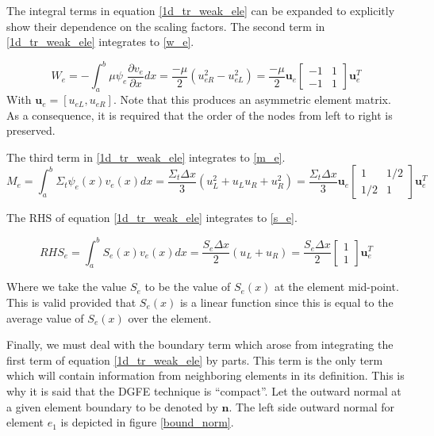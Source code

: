 The integral terms in equation \ref{1d_tr_weak_ele} can be expanded to explicitly show their dependence on the scaling factors.  The second term in \ref{1d_tr_weak_ele} integrates to \ref{w_e}.

\begin{equation}
W_e = -\int_a^b \mu \psi_e \frac{\partial v_e}{\partial x} dx = \frac{-\mu}{2}(u_{eR}^2 - u_{eL}^2) = 
\frac{-\mu}{2} \mathbf u_e 
\begin{bmatrix}
    -1      & 1 \\
    -1       & 1 
\end{bmatrix}
\mathbf u_e^T
\label{w_e}
\end{equation}
With $\mathbf u_e = [u_{eL}, u_{eR}]$.  Note that this produces an asymmetric element matrix.  As a consequence, it is required that the order of the nodes from left to right is preserved.

The third term in \ref{1d_tr_weak_ele} integrates to \ref{m_e}.
\begin{equation}
M_e = \int_a^b \Sigma_t \psi_e(x)v_e(x) dx =
\frac{\Sigma_t \Delta x}{3} (u_L^2 + u_L u_R + u_R^2) = 
\frac{\Sigma_t \Delta x}{3} \mathbf u_e 
\begin{bmatrix}
    1      & 1/2 \\
    1/2      & 1 
\end{bmatrix}
\mathbf u_e^T
\label{m_e}
\end{equation}

The RHS of equation \ref{1d_tr_weak_ele} integrates to \ref{s_e}.

\begin{equation}
RHS_e = \int_a^b S_e(x)v_e(x) dx =
\frac{S_e \Delta x}{2} (u_L + u_R) = 
\frac{S_e \Delta x}{2}
\begin{bmatrix}
    1     \\
    1 
\end{bmatrix}
\mathbf u_e^T
\label{s_e}
\end{equation}

Where we take the value $S_e$ to be the value of $S_e(x)$ at the element mid-point.  This is valid provided that $S_e(x)$ is a linear function since this is equal to the average value of $S_e(x)$ over the element.

Finally, we must deal with the boundary term which arose from integrating the first term of equation \ref{1d_tr_weak_ele} by parts.  This term is the only term which will contain information from neighboring elements in its definition.  This is why it is said that the DGFE technique is ``compact''. Let the outward normal at a given element boundary to be denoted by $\mathbf n$.  The left side outward normal for element $e_1$ is depicted in figure \ref{bound_norm}.

